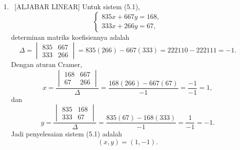 \documentclass[10pt,a4paper]{article}
\begin{document}
\begin{enumerate}
\begin{enumerate}
          \item Matriks $A$ dapat didiagonalkan karena memiliki empat vektor eigen bebas linear di $\mathbb{R}^4$. Ambil
                \[
                  P=
                  \begin{bmatrix}
                    1 & 1 & 5 & 242\\
                    0 & 2 & 3 & -41\\
                    0 & 0 & 6 & -40\\
                    0 & 0 & 0 & 35
                  \end{bmatrix}.
                \]
                Maka
                \[
                  P^{-1}AP
                  =
                  D
                  =
                  \begin{bmatrix}
                    -1 & 0 & 0 & 0\\
                    0 & 3 & 0 & 0\\
                    0 & 0 & 5 & 0\\
                    0 & 0 & 0 & -2
                  \end{bmatrix}.
                \]
        \end{enumerate}

  \item \ [ALJABAR LINEAR]
        Untuk sistem (5.1),
        \[
          \begin{cases}
            835x+667y=168,\\
            333x+266y=67,
          \end{cases}
        \]
        determinan matriks koefisiennya adalah
        \[
          \Delta=
          \begin{vmatrix}
            835 & 667\\
            333 & 266
          \end{vmatrix}
          =835(266)-667(333)
          =222110-222111=-1.
        \]
        Dengan aturan Cramer,
        \[
          x=\frac{
          \begin{vmatrix}
            168 & 667\\
            67 & 266
          \end{vmatrix}}{\Delta}
          =
          \frac{168(266)-667(67)}{-1}
          =
          \frac{-1}{-1}
          =1,
        \]
        dan
        \[
          y=\frac{
          \begin{vmatrix}
            835 & 168\\
            333 & 67
          \end{vmatrix}}{\Delta}
          =
          \frac{835(67)-168(333)}{-1}
          =
          \frac{1}{-1}
          =-1.
        \]
        Jadi penyelesaian sistem (5.1) adalah
        \[
          \boxed{(x,y)=(1,-1).}
        \]


\end{enumerate}
\end{document}
